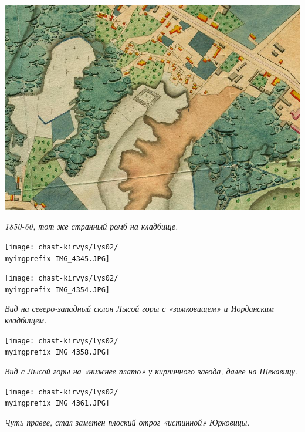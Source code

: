 \newpage

\newpage
\vspace*{\fill}
\begin{center}
\includegraphics[width=\linewidth]{chast-kirvys/lys02/romb-1850.png}

\textit{1850-60, тот же странный ромб на кладбище.}
\end{center}
\vspace*{\fill}

\newpage


\begin{center}
\texttt{[image: chast-kirvys/lys02/\\myimgprefix IMG\_4345.JPG]}
\end{center}

\begin{center}
\texttt{[image: chast-kirvys/lys02/\\myimgprefix IMG\_4354.JPG]}

\textit{Вид на северо-западный склон Лысой горы с «замковищем» и Иорданским кладбищем.}
\end{center}

\newpage

\begin{center}
\texttt{[image: chast-kirvys/lys02/\\myimgprefix IMG\_4358.JPG]}

\textit{Вид с Лысой горы на «нижнее плато» у кирпичного завода, далее на Щекавицу.}
\end{center}


\begin{center}
\texttt{[image: chast-kirvys/lys02/\\myimgprefix IMG\_4361.JPG]}

\textit{Чуть правее, стал заметен плоский отрог «истинной» Юрковицы.}
\end{center}

